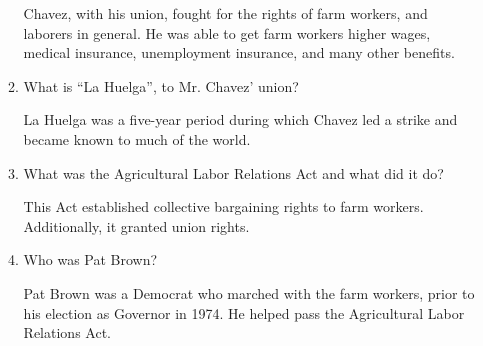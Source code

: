 \documentclass[12pt]{article}
\begin{document}
\begin{enumerate}
\begin{enumerate}
        \begin{justify}

          Chavez, with his union, fought for the rights of farm workers, and laborers in general. He was able to get farm workers higher wages, medical insurance, unemployment insurance, and many other benefits.

        \end{justify}

      \item What is “La Huelga”, to Mr. Chavez' union?

        \begin{justify}

          La Huelga was a five-year period during which Chavez led a strike and became known to much of the world.

        \end{justify}

      \item What was the Agricultural Labor Relations Act and what did it do?

        \begin{justify}

          This Act established collective bargaining rights to farm workers. Additionally, it granted union rights.

        \end{justify}

      \item Who was Pat Brown?

        \begin{justify}

          Pat Brown was a Democrat who marched with the farm workers, prior to his election as Governor in 1974. He helped pass the Agricultural Labor Relations Act.

        \end{justify}

    \end{enumerate}

\end{enumerate}
\end{document}
